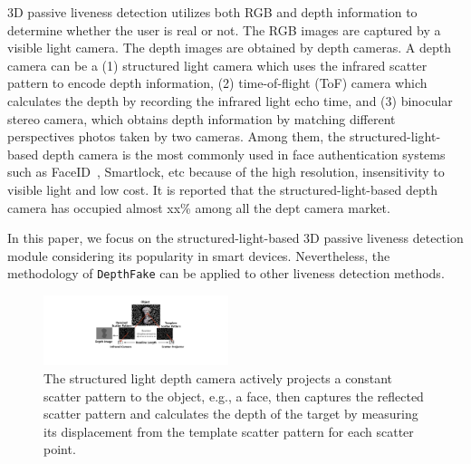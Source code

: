 3D passive liveness detection utilizes both RGB and depth information to determine whether the user is real or not.  The RGB images are captured by a visible light camera. The depth images are obtained by depth cameras. A depth camera can be a (1) structured light camera which uses the infrared scatter pattern to encode depth information, (2) time-of-flight (ToF) camera which calculates the depth by recording the infrared light echo time, and (3) binocular stereo camera, which obtains depth information by matching different perspectives photos taken by two cameras.
Among them, the structured-light-based depth camera is the most commonly used in face authentication systems such as FaceID~\cite{han2007face,bud2018facing}, Smartlock\cite{waseem2020face}, etc because of the high resolution, insensitivity to visible light and low cost. It is reported that the structured-light-based depth camera has occupied almost xx\% among all the dept camera market. 

In this paper, we focus on the structured-light-based 3D passive liveness detection module considering its popularity in smart devices. Nevertheless, the methodology of \texttt{DepthFake} can be applied to other liveness detection methods.

\begin{figure}[pt] 
	\centerline{\includegraphics[width = 0.48\textwidth]{figures/structured_light_camera.pdf}}
	\vspace{-0.1in}
	\caption{The structured light depth camera actively projects a constant scatter pattern to the object, e.g., a face, then captures the reflected scatter pattern and calculates the depth of the target by measuring its displacement from the template scatter pattern for each scatter point. }
	\label{depth_camera}
	\vspace{-0.15in}
\end{figure}


